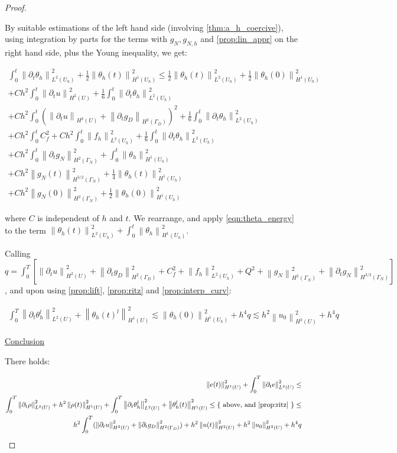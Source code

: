 \documentclass[english,a4paper,9pt,oneside]{scrbook}	%
\theoremstyle{break}
\newenvironment{mproof}[1][\proofname]{%
  \begin{proof}[#1]$ $\par\nobreak\ignorespaces
}{%
  \end{proof}
}
\renewcommand*{\proofname}{Proof}
\theoremstyle{remark}
\newcommand{\ds}{\displaystyle}
\newcommand{\norm}[1]{\left\lVert#1\right\rVert}
\newcommand{\ind}[1]{\{\text{ #1 }\}}
\begin{document}
\begin{appendices}
\begin{mproof}
By suitable estimations of the left hand side (involving \cref{thm:a_h_coercive}), using integration by parts for the terms with $g_N, g_{N,h}$ and \cref{prop:lin_appr} on the right hand side, plus the Young inequality, we get: 


\begin{align*}
\int_0^t\norm{\partial_t \theta_h}^2_{L^2(U_h)} + \frac{1}{2} \norm{\theta_h(t)}_{H^1(U_h)}^2 \leq  \frac{1}{2} \norm{\theta_h(t)}_{L^2(U_h)}^2 + \frac{1}{2} \norm{\theta_h(0)}_{H^1(U_h)}^2\\
+ Ch^2\int_0^t \norm{\partial_t u}_{H^2(U)}^2 + \frac{1}{6}\int_0^t\norm{\partial_t \theta_h}^2_{L^2(U_h)}\\
+ Ch^2\int_0^t(\norm{\partial_t u}_{H^2(U)}+	\norm{\partial_t g_D}_{H^2(\Gamma_D)})^2 + \frac{1}{6} \int_0^t\norm{\partial_t \theta_h}_{L^2(U_h)}^2\\
+ Ch^2\int_0^t C_f^2+ Ch^2\int_0^t \norm{f_h}_{L^2(U_h)}^2  + \frac{1}{6}\int_0^t\norm{\partial_t \theta_h}^2_{L^2(U_h)}\\ 
+ Ch^2\int_0^t \norm{\partial_t g_N}_{H^2(\Gamma_N)}^2 + \int_0^t \norm{ \theta_h}_{H^1(U_h)}^2\\
+ Ch^2\norm{g_N(t)}_{H^{3/2}(\Gamma_N)}^2 + \frac{1}{4}\norm{ \theta_h(t)}_{H^1(U_h)}^2\\
+ Ch^2\norm{g_N(0)}_{H^2(\Gamma_N)}^2 + \frac{1}{2}\norm{ \theta_h(0)}_{H^1(U_h)}^2
\end{align*}


where $C$ is independent of $h$ and $t$. We rearrange, and apply \cref{eqn:theta_energy} to the term $\ds \norm{ \theta_h(t)}^2_{L^2(U_h)} + \int_0^t \norm{ \theta_h}_{H^1(U_h)}^2$. 

Calling $q=\ds \int_0^T \left [ \norm{\partial_t u}_{H^2(U)}^2 +	\norm{\partial_t g_D}_{H^2(\Gamma_D)}^2 + C_f^2 +  \norm{f_h}_{L^2(U_h)}^2 + Q^2+ \norm{g_N}_{H^{2}(\Gamma_N)}^2 + \norm{\partial_t g_N}_{H^{3/2}(\Gamma_N)}^2 \right ] $, and upon using \cref{prop:lift}, \cref{prop:ritz} and \cref{prop:interp_curv}:

\begin{align*}
\int_0^T\norm{\partial_t \theta_h^l}^2_{L^2(U)} + \norm{\theta_h(t)^l}_{H^1(U)}^2 \lesssim  \norm{\theta_h(0)}_{H^1(U_h)}^2+ h^4q \lesssim h^2\norm{u_0}_{H^2(U)}^2+ h^4q
\end{align*}

\underline{Conclusion}

There holds:

\begin{align*}
\norm{e(t)}_{H^1(U)}^2 + \int_0^T\norm{\partial_t e}^2_{L^2(U)}  \leq \\
\int_0^T\norm{\partial_t \rho}^2_{L^2(U)} + h^2\norm{\rho(t)}_{H^1(U)}^2 + \int_0^T\norm{\partial_t  \theta_h^l}^2_{L^2(U)} + \norm{ \theta_h^l(t)}_{H^1(U)}^2\leq \ind{above, and \cref{prop:ritz}}\leq \\
h^2\int_0^T(\norm{\partial_t u }_{H^2(U)}^2 + \norm{\partial_t g_D }_{H^2(\Gamma_D)}^2) + h^2\norm{u(t)}_{H^2(U)}^2 +  h^2\norm{u_0}_{H^2(U)}^2+ h^4q
\end{align*}
\end{mproof}


\end{appendices}
\end{document}
